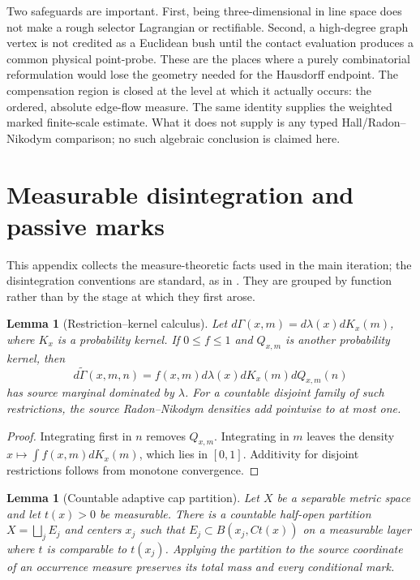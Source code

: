 \documentclass[10pt]{article}
\newtheorem{lemma}[theorem]{Lemma}
\begin{document}
Two safeguards are important. First, being three-dimensional in line space does not make a
rough selector Lagrangian or rectifiable. Second, a high-degree graph vertex is not credited as a
Euclidean bush until the contact evaluation produces a common physical point-probe. These are
the places where a purely combinatorial reformulation would lose the geometry needed for the
Hausdorff endpoint.  The compensation region is closed at the level at which it actually occurs:
the ordered, absolute edge-flow measure.  The same identity supplies the weighted marked
finite-scale estimate.  What it does not supply is any typed Hall/Radon--Nikodym comparison; no
such algebraic conclusion is claimed here.

\appendix

\section{Measurable disintegration and passive marks}
\label{app:measure}

This appendix collects the measure-theoretic facts used in the main iteration; the
disintegration conventions are standard, as in \cite{Bogachev2007}.  They are grouped
by function rather than by the stage at which they first arose.

\begin{lemma}[Restriction--kernel calculus]
\label{lem:restriction-kernel}
Let \(d\Gamma(x,m)=d\lambda(x)dK_x(m)\), where \(K_x\) is a probability kernel.  If
\(0\le f\le1\) and \(Q_{x,m}\) is another probability kernel, then
\[
 d\widetilde\Gamma(x,m,n)=f(x,m)d\lambda(x)dK_x(m)dQ_{x,m}(n)
\]
has source marginal dominated by \(\lambda\).  For a countable disjoint family of such
restrictions, the source Radon--Nikodym densities add pointwise to at most one.
\end{lemma}

\begin{proof}
Integrating first in \(n\) removes \(Q_{x,m}\).  Integrating in \(m\) leaves the density
\(x\mapsto\int f(x,m)dK_x(m)\), which lies in \([0,1]\).  Additivity for disjoint restrictions
follows from monotone convergence.
\end{proof}

\begin{lemma}[Countable adaptive cap partition]
\label{lem:adaptive-cap-partition}
Let \(X\) be a separable metric space and let \(t(x)>0\) be measurable.  There is a countable
half-open partition \(X=\bigsqcup_jE_j\) and centers \(x_j\) such that
\(E_j\subset B(x_j,Ct(x))\) on a measurable layer where \(t\) is comparable to \(t(x_j)\).
Applying the partition to the source coordinate of an occurrence measure preserves its total
mass and every conditional mark.
\end{lemma}
\end{document}
